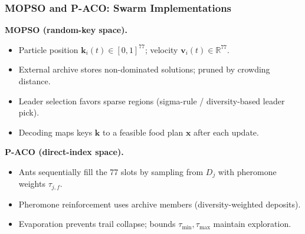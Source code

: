 \documentclass[aspectratio=169,10pt]{beamer}
\begin{document}
\begin{frame}
\frametitle{MOPSO and P-ACO: Swarm Implementations}

\textbf{MOPSO (random-key space).}
\begin{itemize}
  \item Particle position $\mathbf{k}_i(t)\in[0,1]^{77}$; velocity $\mathbf{v}_i(t)\in\mathbb{R}^{77}$.
  \item External archive stores non-dominated solutions; pruned by crowding distance.
  \item Leader selection favors sparse regions (sigma-rule / diversity-based leader pick).
  \item Decoding maps keys $\mathbf{k}$ to a feasible food plan $\mathbf{x}$ after each update.
\end{itemize}

\vspace{0.3cm}

\textbf{P-ACO (direct-index space).}
\begin{itemize}
  \item Ants sequentially fill the 77 slots by sampling from $D_j$ with pheromone weights $\tau_{j,f}$.
  \item Pheromone reinforcement uses archive members (diversity-weighted deposits).
  \item Evaporation prevents trail collapse; bounds $\tau_{\min},\tau_{\max}$ maintain exploration.
\end{itemize}

\end{frame}
\end{document}
